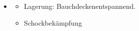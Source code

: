 \label{m:eileiterschwangerschaft-rupturiert}
\begin{itemize}
  \item \TxMassVitMKBes
  \begin{itemize}
    \item Lagerung: Bauchdeckenentspannend.
    \item Schockbekämpfung
  \end{itemize}
\end{itemize}